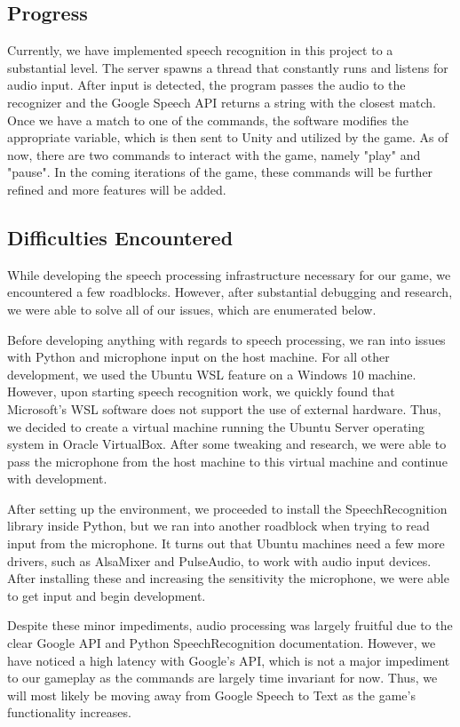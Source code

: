 \documentclass[titlepage, 12pt]{scrartcl}
\begin{document}
    \subsection{Progress}
        Currently, we have implemented speech recognition in this project to a substantial level. The server spawns a thread that constantly runs and listens for audio input. After input is detected, the program passes the audio to the recognizer and the Google Speech API returns a string with the closest match. Once we have a match to one of the commands, the software modifies the appropriate variable, which is then sent to Unity and utilized by the game. As of now, there are two commands to interact with the game, namely "play" and "pause". In the coming iterations of the game, these commands will be further refined and more features will be added. 
    \subsection{Difficulties Encountered}
        While developing the speech processing infrastructure necessary for our game, we encountered a few roadblocks. However, after substantial debugging and research, we were able to solve all of our issues, which are enumerated below. \par
        Before developing anything with regards to speech processing, we ran into issues with Python and microphone input on the host machine. For all other development, we used the Ubuntu WSL feature on a Windows 10 machine. However, upon starting speech recognition work, we quickly found that Microsoft's WSL software does not support the use of external hardware. Thus, we decided to create a virtual machine running the Ubuntu Server operating system in Oracle VirtualBox. After some tweaking and research, we were able to pass the microphone from the host machine to this virtual machine and continue with development. \par
        After setting up the environment, we proceeded to install the SpeechRecognition library inside Python, but we ran into another roadblock when trying to read input from the microphone. It turns out that Ubuntu machines need a few more drivers, such as AlsaMixer and PulseAudio, to work with audio input devices. After installing these and increasing the sensitivity the microphone, we were able to get input and begin development. \par
        Despite these minor impediments, audio processing was largely fruitful due to the clear Google API and Python SpeechRecognition documentation. However, we have noticed a high latency with Google's API, which is not a major impediment to our gameplay as the commands are largely time invariant for now. Thus, we will most likely be moving away from Google Speech to Text as the game's functionality increases.
\end{document}
